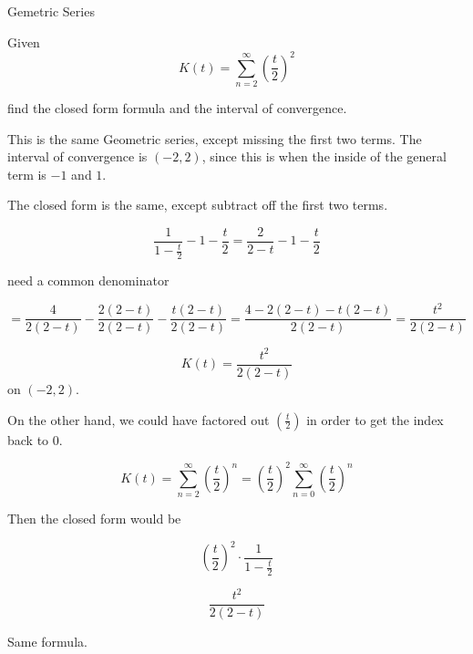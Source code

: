\documentclass{ximera}
\begin{document}
\begin{example} Gemetric Series


Given 
\[    K(t) =   \sum_{n=2}^{\infty}  \left( \frac{t}{2} \right)^2    \]

find the closed form formula and the interval of convergence.




\begin{explanation}


This is the same Geometric series, except missing the first two terms.  The interval of convergence is $(-2, 2)$, since this is when the inside of the general term is $-1$ and $1$.


The closed form is the same, except subtract off the first two terms.

\[  \frac{1}{1 - \frac{t}{2}}  - 1 - \frac{t}{2}    =     \frac{2}{2-t}  - 1 - \frac{t}{2}     \]


need a common denominator


\[=     \frac{4}{2(2-t)}  - \frac{2(2-t)}{2(2-t)} - \frac{t(2-t)}{2(2-t)} = \frac{4-2(2-t)-t(2-t)}{2(2-t)}  = \frac{t^2}{2(2-t)}   \]





\[    K(t) =   \frac{t^2}{2(2-t)}    \] on $(-2, 2)$.


\end{explanation}

\end{example}




On the other hand, we could have factored out $\left( \frac{t}{2} \right)$ in order to get the index back to $0$.


\[    K(t) =   \sum_{n=2}^{\infty}  \left( \frac{t}{2} \right)^n    =  \left( \frac{t}{2} \right)^2 \sum_{n=0}^{\infty}  \left( \frac{t}{2} \right)^n   \]


Then the closed form would be


\[    \left( \frac{t}{2} \right)^2  \cdot \frac{1}{1 - \frac{t}{2}}            \]



\[     \frac{t^2}{2(2 - t)}            \]



Same formula.
\end{document}
